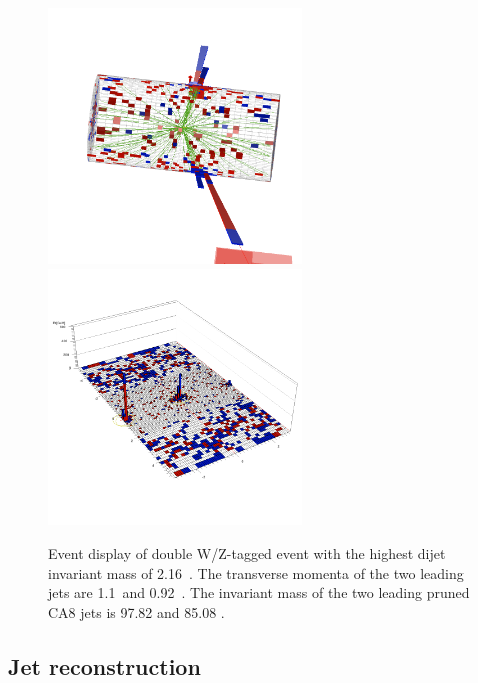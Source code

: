 \begin{figure}[!htbp]
\begin{center}
\includegraphics[width=0.6\textwidth,angle=0]{EXO-12-024/figs/event-display/highdoublemass/tower-white.png}
\includegraphics[width=0.6\textwidth,angle=0]{EXO-12-024/figs/event-display/highdoublemass/lego-white.png}
\end{center}
\caption{Event display of double W/Z-tagged event with the highest dijet invariant mass of 2.16~\TeVcc .
The transverse momenta of the two leading jets are 1.1~\TeVcc and 0.92~\TeVcc .
The invariant mass of the two leading pruned CA8 jets is 97.82 \GeVcc and 85.08 \GeVcc .
}
\label{fig:eventdisplay2a}
\end{figure}


\subsection{Jet reconstruction}
\label{sec:reconstruction}

